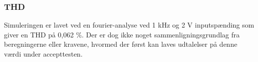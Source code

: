 
\subsubsection*{THD}
Simuleringen er lavet ved en fourier-analyse ved 1 kHz og 2 V inputspænding som giver en THD på 0,062 \%. Der er dog ikke noget sammenligningsgrundlag fra beregningerne eller kravene, hvormed der først kan laves udtalelser på denne værdi under accepttesten. 

